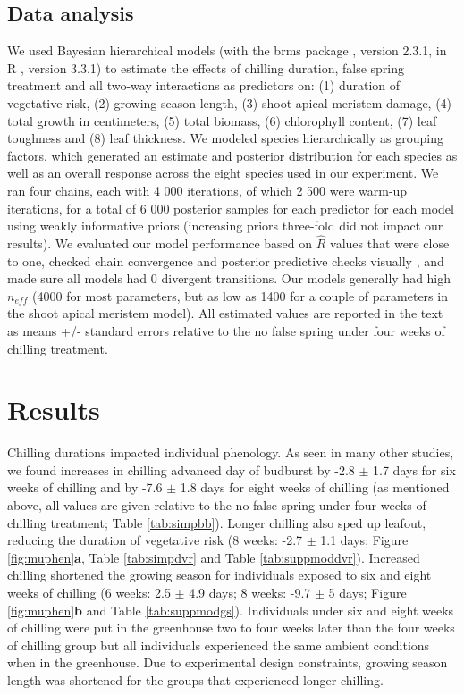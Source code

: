 \documentclass{article}\usepackage[]{graphicx}\usepackage[]{color}
\begin{document}
\subsection*{Data analysis}
We used Bayesian hierarchical models (with the brms package \citep{brms}, version 2.3.1,  in R \citep{R}, version 3.3.1) to estimate the effects of chilling duration, false spring treatment and all two-way interactions as predictors on: (1) duration of vegetative risk, (2) growing season length, (3) shoot apical meristem damage, (4) total growth in centimeters, (5) total biomass, (6) chlorophyll content, (7) leaf toughness and (8) leaf thickness. We modeled species hierarchically as grouping factors, which generated an estimate and posterior distribution for each species as well as an overall response across the eight species used in our experiment. We ran four chains, each with 4 000 iterations, of which 2 500 were warm-up iterations, for a total of 6 000 posterior samples for each predictor for each model using weakly informative priors (increasing priors three-fold did not impact our results). We evaluated our model performance based on $\hat{R}$ values that were close to one, checked chain convergence and posterior predictive checks visually \citep{BDA}, and made sure all models had 0 divergent transitions. Our models generally had high $n_{eff}$ (4000 for most parameters, but as low as 1400 for a couple of parameters in the shoot apical meristem model). All estimated values are reported in the text as means +/- standard errors relative to the no false spring under four weeks of chilling treatment.


\section*{Results} 
Chilling durations impacted individual phenology. As seen in many other studies, we found increases in chilling advanced day of budburst by -2.8 $\pm$ 1.7 days for six weeks of chilling and by -7.6 $\pm$ 1.8 days for eight weeks of chilling (as mentioned above, all values are given relative to the no false spring under four weeks of chilling treatment; Table \ref{tab:simpbb}). Longer chilling also sped up leafout, reducing the duration of vegetative risk (8 weeks: -2.7 $\pm$ 1.1 days; Figure \ref{fig:muphen}\textbf{a}, Table \ref{tab:simpdvr} and Table \ref{tab:suppmoddvr}). Increased chilling shortened the growing season for individuals exposed to six and eight weeks of chilling (6 weeks: 2.5 $\pm$ 4.9 days; 8 weeks: -9.7 $\pm$ 5 days; Figure \ref{fig:muphen}\textbf{b} and Table \ref{tab:suppmodgs}). Individuals under six and eight weeks of chilling were put in the greenhouse two to four weeks later than the four weeks of chilling group but all individuals experienced the same ambient conditions when in the greenhouse. Due to experimental design constraints, growing season length was shortened for the groups that experienced longer chilling.
 
\end{document}
